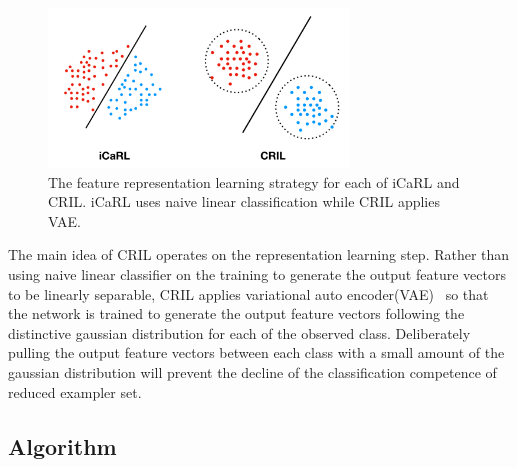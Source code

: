 \begin{figure}[h]
\includegraphics[width=80mm]{data/compact_representation.png}
\centering
\caption{The feature representation learning strategy for each of iCaRL and CRIL. iCaRL uses naive linear classification while CRIL applies VAE. \label{fig:compact_representation}}
\end{figure}

The main idea of CRIL operates on the representation learning step. Rather than using naive linear classifier on the training to generate the output feature vectors to be linearly separable, CRIL applies variational auto encoder(VAE)~\cite{Kingma:2013aa} so that the network is trained to generate the output feature vectors following the distinctive gaussian distribution for each of the observed class. Deliberately pulling the output feature vectors between each class with a small amount of the gaussian distribution will prevent the decline of the classification competence of reduced exampler set.

\subsection{Algorithm} %
\label{sec:algorithm}
